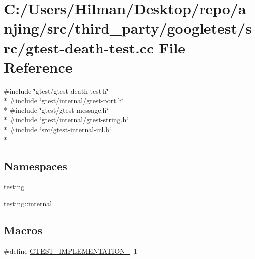 \hypertarget{gtest-death-test_8cc}{}\section{C\+:/\+Users/\+Hilman/\+Desktop/repo/anjing/src/third\+\_\+party/googletest/src/gtest-\/death-\/test.cc File Reference}
\label{gtest-death-test_8cc}
{\ttfamily \#include \char`\"{}gtest/gtest-\/death-\/test.\+h\char`\"{}}\\*
{\ttfamily \#include \char`\"{}gtest/internal/gtest-\/port.\+h\char`\"{}}\\*
{\ttfamily \#include \char`\"{}gtest/gtest-\/message.\+h\char`\"{}}\\*
{\ttfamily \#include \char`\"{}gtest/internal/gtest-\/string.\+h\char`\"{}}\\*
{\ttfamily \#include \char`\"{}src/gtest-\/internal-\/inl.\+h\char`\"{}}\\*
\subsection*{Namespaces}
\begin{DoxyCompactItemize}
\item 
 \hyperlink{namespacetesting}{testing}
\item 
 \hyperlink{namespacetesting_1_1internal}{testing\+::internal}
\end{DoxyCompactItemize}
\subsection*{Macros}
\begin{DoxyCompactItemize}
\item 
\#define \hyperlink{gtest-death-test_8cc_a83bd232fd1077579fada92c31bb7469f}{G\+T\+E\+S\+T\+\_\+\+I\+M\+P\+L\+E\+M\+E\+N\+T\+A\+T\+I\+O\+N\+\_\+}~1
\end{DoxyCompactItemize}
